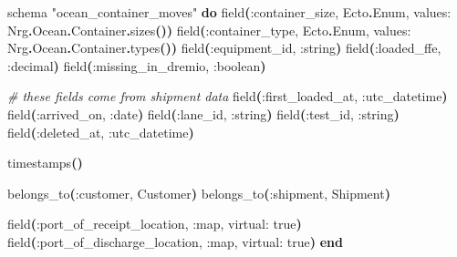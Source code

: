 \documentclass[11pt,a4paper,greek,twoside]{template-xe}
\newenvironment{Shaded}{\begin{english}\begin{snugshade}}{\end{snugshade}\end{english}}
\newcommand{\CommentTok}[1]{\textcolor[rgb]{0.56,0.35,0.01}{\textit{#1}}}
\newcommand{\ConstantTok}[1]{\textcolor[rgb]{0.56,0.35,0.01}{#1}}
\newcommand{\FunctionTok}[1]{\textcolor[rgb]{0.13,0.29,0.53}{\textbf{#1}}}
\newcommand{\KeywordTok}[1]{\textcolor[rgb]{0.13,0.29,0.53}{\textbf{#1}}}
\newcommand{\NormalTok}[1]{#1}
\newcommand{\OperatorTok}[1]{\textcolor[rgb]{0.81,0.36,0.00}{\textbf{#1}}}
\newcommand{\StringTok}[1]{\textcolor[rgb]{0.31,0.60,0.02}{#1}}
\newcommand{\VariableTok}[1]{\textcolor[rgb]{0.00,0.00,0.00}{#1}}
\begin{document}
\begin{Shaded}
\begin{Highlighting}[]
\NormalTok{schema }\StringTok{"ocean\_container\_moves"} \KeywordTok{do}
\NormalTok{  field}\FunctionTok{(}\VariableTok{:container\_size}\NormalTok{, }\ConstantTok{Ecto}\OperatorTok{.}\ConstantTok{Enum}\NormalTok{, }\VariableTok{values:} \ConstantTok{Nrg}\OperatorTok{.}\ConstantTok{Ocean}\OperatorTok{.}\ConstantTok{Container}\OperatorTok{.}\NormalTok{sizes}\FunctionTok{())}
\NormalTok{  field}\FunctionTok{(}\VariableTok{:container\_type}\NormalTok{, }\ConstantTok{Ecto}\OperatorTok{.}\ConstantTok{Enum}\NormalTok{, }\VariableTok{values:} \ConstantTok{Nrg}\OperatorTok{.}\ConstantTok{Ocean}\OperatorTok{.}\ConstantTok{Container}\OperatorTok{.}\NormalTok{types}\FunctionTok{())}
\NormalTok{  field}\FunctionTok{(}\VariableTok{:equipment\_id}\NormalTok{, }\VariableTok{:string}\FunctionTok{)}
\NormalTok{  field}\FunctionTok{(}\VariableTok{:loaded\_ffe}\NormalTok{, }\VariableTok{:decimal}\FunctionTok{)}
\NormalTok{  field}\FunctionTok{(}\VariableTok{:missing\_in\_dremio}\NormalTok{, }\VariableTok{:boolean}\FunctionTok{)}

  \CommentTok{\# these fields come from shipment data}
\NormalTok{  field}\FunctionTok{(}\VariableTok{:first\_loaded\_at}\NormalTok{, }\VariableTok{:utc\_datetime}\FunctionTok{)}
\NormalTok{  field}\FunctionTok{(}\VariableTok{:arrived\_on}\NormalTok{, }\VariableTok{:date}\FunctionTok{)}
\NormalTok{  field}\FunctionTok{(}\VariableTok{:lane\_id}\NormalTok{, }\VariableTok{:string}\FunctionTok{)}
\NormalTok{  field}\FunctionTok{(}\VariableTok{:test\_id}\NormalTok{, }\VariableTok{:string}\FunctionTok{)}
\NormalTok{  field}\FunctionTok{(}\VariableTok{:deleted\_at}\NormalTok{, }\VariableTok{:utc\_datetime}\FunctionTok{)}

\NormalTok{  timestamps}\FunctionTok{()}

\NormalTok{  belongs\_to}\FunctionTok{(}\VariableTok{:customer}\NormalTok{, }\ConstantTok{Customer}\FunctionTok{)}
\NormalTok{  belongs\_to}\FunctionTok{(}\VariableTok{:shipment}\NormalTok{, }\ConstantTok{Shipment}\FunctionTok{)}

\NormalTok{  field}\FunctionTok{(}\VariableTok{:port\_of\_receipt\_location}\NormalTok{, }\VariableTok{:map}\NormalTok{, }\VariableTok{virtual:} \ConstantTok{true}\FunctionTok{)}
\NormalTok{  field}\FunctionTok{(}\VariableTok{:port\_of\_discharge\_location}\NormalTok{, }\VariableTok{:map}\NormalTok{, }\VariableTok{virtual:} \ConstantTok{true}\FunctionTok{)}
\KeywordTok{end}
\end{Highlighting}
\end{Shaded}
\end{document}
